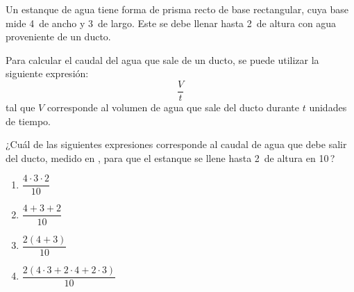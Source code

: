 \begin{problem}
    Un estanque de agua tiene forma de prisma recto de base rectangular, cuya base mide 4\, de ancho y 3\, de largo. Este se debe llenar hasta 2\, de altura con agua proveniente de un ducto.

    Para calcular el caudal del agua que sale de un ducto, se puede utilizar la siguiente expresión:
    \[
    \frac{V}{t}
    \]
    tal que $V$ corresponde al volumen de agua que sale del ducto durante $t$ unidades de tiempo.

    ¿Cuál de las siguientes expresiones corresponde al caudal de agua que debe salir del ducto, medido en , para que el estanque se llene hasta 2\, de altura en 10\,?

    \begin{enumerate}[label=\Alph*.]
        \item $\dfrac{4 \cdot 3 \cdot 2}{10}$
        \item $\dfrac{4 + 3 + 2}{10}$
        \item $\dfrac{2(4 + 3)}{10}$
        \item $\dfrac{2(4 \cdot 3 + 2 \cdot 4 + 2 \cdot 3)}{10}$
    \end{enumerate}
\end{problem}
